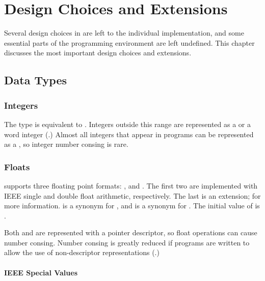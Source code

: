 \chapter{Design Choices and Extensions}

Several design choices in \clisp{} are left to the individual
implementation, and some essential parts of the programming environment
are left undefined.  This chapter discusses the most important design
choices and extensions.

\section{Data Types}

\subsection{Integers}

The  type is equivalent to .
Integers outside this range are represented as a  or
a word integer (.)  Almost all integers that
appear in programs can be represented as a , so integer
number consing is rare.


\subsection{Floats}
\label{ieee-float}

\cmucl{} supports three floating point formats:
,  and
.  The first two are implemented with
IEEE single and double float arithmetic, respectively.  The last is an
extension;  for more information.
 is a synonym for , and
 is a synonym for .  The initial
value of  is .

Both  and  are represented with
a pointer descriptor, so float operations can cause number consing.
Number consing is greatly reduced if programs are written to allow the
use of non-descriptor representations (.)


\subsubsection{IEEE Special Values}

